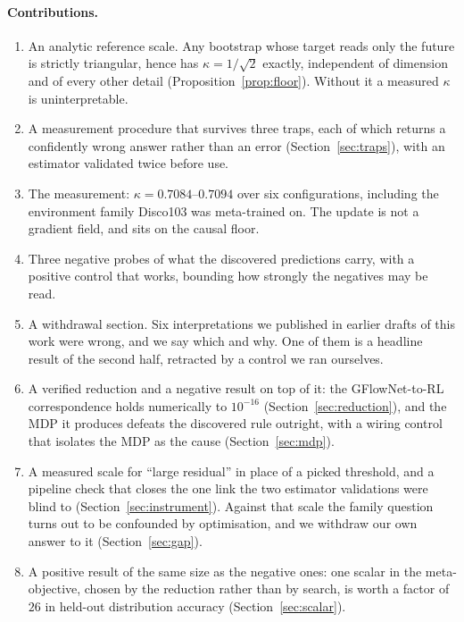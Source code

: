 \documentclass[11pt]{article}
\theoremstyle{remark}
\begin{document}
\paragraph{Contributions.}
\begin{enumerate}\itemsep2pt
\item An analytic reference scale. Any bootstrap whose target reads only the
future is strictly triangular, hence has $\kappa = 1/\sqrt 2$ exactly,
independent of dimension and of every other detail (Proposition~\ref{prop:floor}).
Without it a measured $\kappa$ is uninterpretable.
\item A measurement procedure that survives three traps, each of which returns a
confidently wrong answer rather than an error (Section~\ref{sec:traps}), with an
estimator validated twice before use.
\item The measurement: $\kappa = 0.7084$--$0.7094$ over six configurations,
including the environment family Disco103 was meta-trained on. The update is not
a gradient field, and sits on the causal floor.
\item Three negative probes of what the discovered predictions carry, with a
positive control that works, bounding how strongly the negatives may be read.
\item A withdrawal section. Six interpretations we published in earlier drafts of
this work were wrong, and we say which and why. One of them is a headline result
of the second half, retracted by a control we ran ourselves.
\item A verified reduction and a negative result on top of it: the
GFlowNet-to-RL correspondence holds numerically to $10^{-16}$
(Section~\ref{sec:reduction}), and the MDP it produces defeats the discovered
rule outright, with a wiring control that isolates the MDP as the cause
(Section~\ref{sec:mdp}).
\item A measured scale for ``large residual'' in place of a picked threshold, and
a pipeline check that closes the one link the two estimator validations were
blind to (Section~\ref{sec:instrument}). Against that scale the family question
turns out to be confounded by optimisation, and we withdraw our own answer to it
(Section~\ref{sec:gap}).
\item A positive result of the same size as the negative ones: one scalar in the
meta-objective, chosen by the reduction rather than by search, is worth a factor
of $26$ in held-out distribution accuracy (Section~\ref{sec:scalar}).
\end{enumerate}
\end{document}
